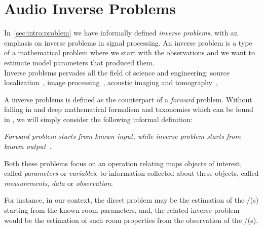 \section{Audio Inverse Problems}\label{sec:processing:inverse}
\cite{kitic2015cosparse}
In~\cref{sec:intro:problem} we have informally defined \textit{inverse problems}, with an emphasis on inverse problems in signal processing.
An inverse problem is a type of a mathematical problem where we start with the observations and we want to estimate model parameters that produced them.
\\Inverse problems pervades all the field of science and engineering:
source localization~\cite{},
image processing~\cite{},
acoustic imaging and tomography~\cite{},

A inverse problems is defined as the counterpart of a \textit{forward} problem.
Without falling in and deep mathematical formalism and taxonomies which can be found in ,
we will simply consider the following informal definition:
\begin{center}
    \textit{\emph{Forward problem} starts from known input, while \emph{inverse problem} starts from known output~\cite{santamarina2005discrete}.}
\end{center}
Both these problems focus on an operation relating maps objects of interest, called \textit{parameters} or \textit{variables},
to information collected about these objects, called \textit{measurements}, \textit{data} or \textit{observation}.

For instance, in our context, the direct problem may be the estimation of the \RIR/(s) starting from the known room parameters,
and, the related inverse problem would be the estimation of such room properties from the observation of the \RIR/(s).


